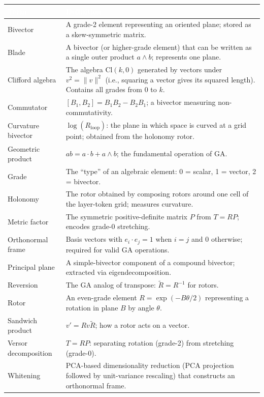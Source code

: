 \documentclass[11pt, twoside, openright]{memoir}
\newcommand{\ip}{\cdot}           %
\newcommand{\op}{\wedge}          %
\newcommand{\rev}[1]{\widetilde{#1}} %
\begin{document}
\begin{center}
\renewcommand{\arraystretch}{1.5}\small
\begin{tabular}{@{}L{4cm} L{7.5cm}@{}}
\toprule
{}
\textcolor{white}{\textbf{Term}} &
\textcolor{white}{\textbf{Definition}} \\
\midrule
Bivector &
  A grade-2 element representing an oriented plane; stored as a
  skew-symmetric matrix. \\
Blade &
  A bivector (or higher-grade element) that can be written as a single
  outer product $a \op b$; represents one plane. \\
Clifford algebra &
  The algebra $\mathrm{Cl}(k, 0)$ generated by vectors under
  $v^2 = \|v\|^2$ (i.e., squaring a vector gives its squared length).  Contains all grades from 0 to $k$. \\
Commutator &
  $[B_1, B_2] = B_1 B_2 - B_2 B_1$; a bivector measuring
  non-commutativity. \\
Curvature bivector &
  $\log(R_{\text{loop}})$: the plane in which space is curved at a
  grid point; obtained from the holonomy rotor. \\
Geometric product &
  $ab = a \ip b + a \op b$; the fundamental operation of GA. \\
Grade &
  The ``type'' of an algebraic element: 0 = scalar, 1 = vector,
  2 = bivector. \\
Holonomy &
  The rotor obtained by composing rotors around one cell of the layer-token grid; measures
  curvature. \\
Metric factor &
  The symmetric positive-definite matrix $P$ from $T = RP$; encodes
  grade-0 stretching. \\
Orthonormal frame &
  Basis vectors with $e_i \ip e_j = 1$ when $i=j$ and $0$ otherwise; required for valid GA
  operations. \\
Principal plane &
  A simple-bivector component of a compound bivector; extracted via
  eigendecomposition. \\
Reversion &
  The GA analog of transpose: $\rev{R} = R^{-1}$ for rotors. \\
Rotor &
  An even-grade element $R = \exp(-B\theta/2)$ representing a rotation
  in plane $B$ by angle $\theta$. \\
Sandwich product &
  $v' = R v \rev{R}$; how a rotor acts on a vector. \\
Versor decomposition &
  $T = RP$: separating rotation (grade-2) from stretching (grade-0). \\
Whitening &
  PCA-based dimensionality reduction (PCA projection followed by unit-variance rescaling) that constructs an orthonormal frame. \\
\bottomrule
\end{tabular}
\end{center}
\end{document}
